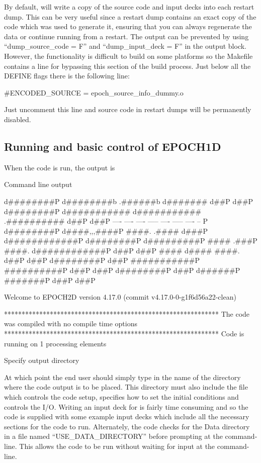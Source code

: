 By default, {\EPOCH} will write a copy of the source code and input decks
into each restart dump. This can be very useful since a restart dump contains
an exact copy of the code which was used to generate it, ensuring that you
can always regenerate the data or continue running from a restart.
The output can be prevented by using ``dump\_source\_code = F'' and
``dump\_input\_deck = F'' in the output block.
However, the functionality is difficult to build on some platforms so
the Makefile contains a line for bypassing this section of the build
process. Just below all the DEFINE flags there is the following line:
\begin{boxverbatim}
#ENCODED_SOURCE = epoch_source_info_dummy.o
\end{boxverbatim}
Just uncomment this line and source code in restart dumps will be permanently
disabled.


\subsection{\texorpdfstring
  {Running {\EPOCH} and basic control of EPOCH1D}
  {Running {EPOCH} and basic control of EPOCH1D}}
When the code is run, the output is
{\samepage
\begin{lboxverbatim}{Command line output}

        d########P  d########b        .######b          d#######  d##P      d##P
       d########P  d###########    d###########     .##########  d##P      d##P
      ----        ----     ----  -----     ----   -----         ----      -- P
     d########P  d####,,,####P ####.      .#### d###P          d############P
    d########P  d#########P   ####       .###P ####.          d############P
   d##P        d##P           ####     d####   ####.         d##P      d##P
  d########P  d##P            ###########P     ##########P  d##P      d##P
 d########P  d##P              d######P          #######P  d##P      d##P

 Welcome to EPOCH2D version 4.17.0   (commit v4.17.0-0-g1f6d56a22-clean)

 *************************************************************
 The code was compiled with no compile time options
 *************************************************************
 Code is running on 1 processing elements

 Specify output directory
\end{lboxverbatim}
}

At which point the end user should simply type in the name of the directory
where the code output is to be placed. This directory must also include the
file  which controls the code setup, specifies how to set the
initial conditions and controls the I/O. Writing an input deck for {\EPOCH} is
fairly time consuming and so the code is supplied with some example input decks
which include all the necessary sections for the code to run. Alternately, the
code checks for the Data directory in a file named ``USE\_DATA\_DIRECTORY''
before prompting at the command-line. This allows the code to be run without
waiting for input at the command-line.

